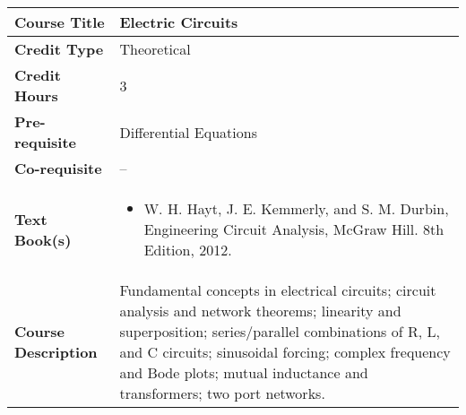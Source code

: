 \documentclass[11pt]{article}
\begin{document}
\begin{table}[h!]
\begin{tabular}{|l|l|}
\hline
\textbf{Course Title}       &   Electric Circuits \\ \hline
\textbf{Credit Type}        &   Theoretical \\ \hline
\textbf{Credit Hours}       &  3 \\ \hline
\textbf{Pre-requisite}       &  Differential Equations \\ \hline
\textbf{Co-requisite}       &  -- \\ \hline
\textbf{Text Book(s)}       & \begin{minipage}{.70\textwidth}
\begin{itemize} \itemsep-0.4em
	\vspace{3mm}
	\item W. H. Hayt, J. E. Kemmerly, and S. M. Durbin, Engineering Circuit Analysis, McGraw Hill. 8th Edition, 2012.
	\vspace{3mm}
\end{itemize}
\end{minipage}\\ \hline
\textbf{Course Description} & \begin{minipage}{.70\textwidth}
\vspace{3mm}
Fundamental concepts in electrical circuits; circuit analysis and network theorems; linearity and superposition; series/parallel combinations of R, L, and C circuits; sinusoidal forcing; complex frequency and Bode plots; mutual inductance and transformers; two port networks.
\vspace{3mm}
\end{minipage} \\ \hline
\end{tabular}
\end{table}
\end{document}
